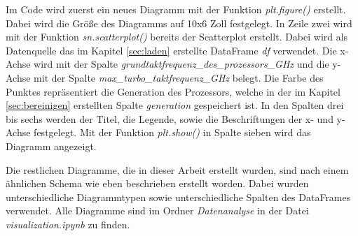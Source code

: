 Im Code wird zuerst ein neues Diagramm mit der Funktion \textit{plt.figure()} erstellt. Dabei wird die Größe des Diagramms auf 10x6 Zoll festgelegt. In Zeile
zwei wird mit der Funktion \textit{sn.scatterplot()} bereits der Scatterplot erstellt. Dabei wird als Datenquelle das im Kapitel \ref{sec:laden} erstellte DataFrame
\textit{df} verwendet. Die x-Achse wird mit der Spalte \textit{grundtaktfrequenz\_des\_prozessors\_GHz} und die y-Achse mit der Spalte \textit{max\_turbo\_taktfrequenz\_GHz}
belegt. Die Farbe des Punktes repräsentiert die Generation des Prozessors, welche in der im Kapitel \ref{sec:bereinigen} erstellten Spalte \textit{generation} gespeichert ist.
In den Spalten drei bis sechs werden der Titel, die Legende, sowie die Beschriftungen der x- und y-Achse festgelegt. Mit der Funktion \textit{plt.show()} in Spalte sieben wird
das Diagramm angezeigt.

Die restlichen Diagramme, die in dieser Arbeit erstellt wurden, sind nach einem ähnlichen Schema wie eben beschrieben erstellt worden. Dabei wurden unterschiedliche Diagrammtypen
sowie unterschiedliche Spalten des DataFrames verwendet. Alle Diagramme sind im Ordner \textit{Datenanalyse} in der Datei \textit{visualization.ipynb} zu finden.